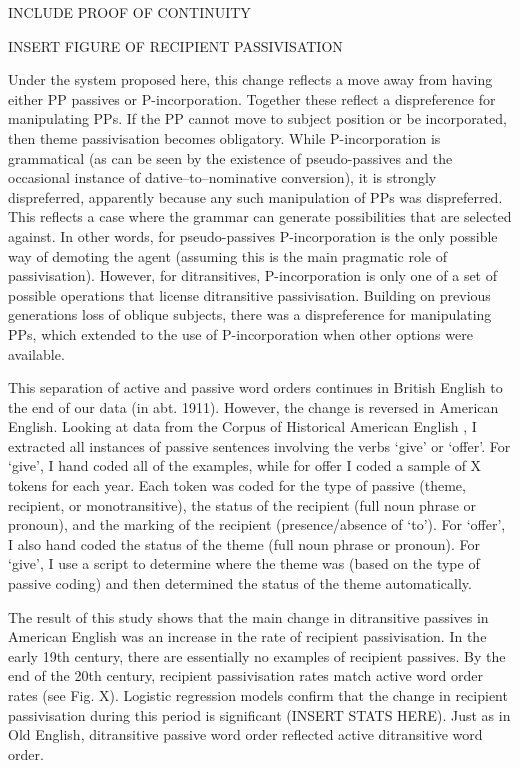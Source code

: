 	INCLUDE PROOF OF CONTINUITY

	INSERT FIGURE OF RECIPIENT PASSIVISATION

	Under the system proposed here, this change reflects a move away from having either PP passives or P-incorporation. Together these reflect a dispreference for manipulating PPs. If the PP cannot move to subject position or be incorporated, then theme passivisation becomes obligatory. While P-incorporation is grammatical (as can be seen by the existence of pseudo-passives and the occasional instance of dative--to--nominative conversion), it is strongly dispreferred, apparently because any such manipulation of PPs was dispreferred. This reflects a case where the grammar can generate possibilities that are selected against. In other words, for pseudo-passives P-incorporation is the only possible way of demoting the agent (assuming this is the main pragmatic role of passivisation). However, for ditransitives, P-incorporation is only one of a set of possible operations that license ditransitive passivisation. Building on previous generations loss of oblique subjects, there was a dispreference for manipulating PPs, which extended to the use of P-incorporation when other options were available.

	This separation of active and passive word orders continues in British English to the end of our data (in abt. 1911). However, the change is reversed in American English. Looking at data from the Corpus of Historical American English \citep{Davies.2010}, I extracted all instances of passive sentences involving the verbs `give' or `offer'. For `give', I hand coded all of the examples, while for offer I coded a sample of X tokens for each year. Each token was coded for the type of passive (theme, recipient, or monotransitive), the status of the recipient (full noun phrase or pronoun), and the marking of the recipient (presence/absence of `to'). For `offer', I also hand coded the status of the theme (full noun phrase or pronoun). For `give', I use a script to determine where the theme was (based on the type of passive coding) and then determined the status of the theme automatically.
	
	The result of this study shows that the main change in ditransitive passives in American English was an increase in the rate of recipient passivisation. In the early 19th century, there are essentially no examples of recipient passives. By the end of the 20th century, recipient passivisation rates match active word order rates (see Fig. X). Logistic regression models confirm that the change in recipient passivisation during this period is significant (INSERT STATS HERE). Just as in Old English, ditransitive passive word order reflected active ditransitive word order.

